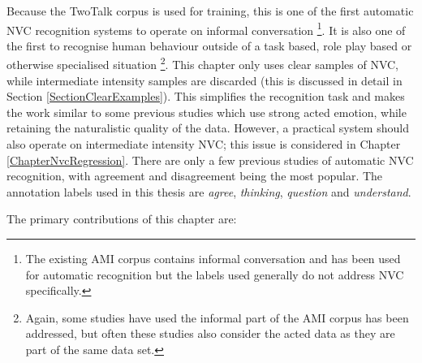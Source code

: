 Because the TwoTalk corpus is used for training, this is one of the first automatic \ac{NVC} recognition systems to operate on informal conversation \footnote{The existing AMI corpus contains informal conversation and has been used for automatic recognition but the labels used generally do not address \ac{NVC} specifically.}. It is also one of the first to recognise human behaviour outside of a task based, role play based or otherwise specialised situation \footnote{Again, some studies have used the informal part of the AMI corpus has been addressed, but often these studies also consider the acted data as they are part of the same data set.}. 
This chapter only uses clear samples of \ac{NVC}, while intermediate intensity samples are discarded (this is discussed in detail in Section \ref{SectionClearExamples}). This simplifies the recognition task and makes the work similar to some previous studies which use strong acted emotion, while retaining the naturalistic quality of the data. However, a practical system should also operate on intermediate intensity \ac{NVC}; this issue is considered in Chapter \ref{ChapterNvcRegression}.
There are only a few previous studies of automatic \ac{NVC} recognition, with agreement and disagreement being the most popular. 
The annotation labels used in this thesis are \textit{agree}, \textit{thinking}, \textit{question} and \textit{understand}. 

The primary contributions of this chapter are:

